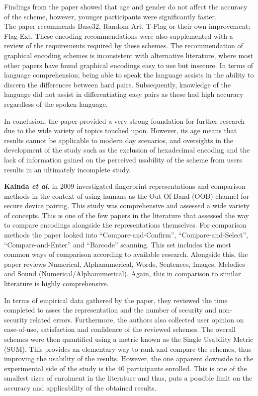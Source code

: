 Findings from the paper showed that age and gender do not affect the accuracy of the scheme, however, younger participants were significantly faster. \\
The paper recommends Base32, Random Art, T-Flag or their own improvement; Flag Ext. These encoding recommendations were also supplemented with a review of the requirements required by these schemes. The recommendation of graphical encoding schemes is inconsistent with alternative literature, where most other papers have found graphical encodings easy to use but insecure.
In terms of language comprehension; being able to speak the language assists in the ability to discern the differences between hard pairs. Subsequently, knowledge of the language did not assist in differentiating easy pairs as these had high accuracy regardless of the spoken language.

In conclusion, the paper provided a very strong foundation for further research due to the wide variety of topics touched upon. However, its age means that results cannot be applicable to modern day scenarios, and oversights in the development of the study such as the exclusion of hexadecimal encoding and the lack of information gained on the perceived usability of the scheme from users results in an ultimately incomplete study.

\textbf{Kainda \textit{et al.}}\cite{kainda2009usability} in 2009 investigated fingerprint representations and comparison methods in the context of using humans as the Out-Of-Band (OOB) channel for secure device pairing. This study was comprehensive and assessed a wide variety of concepts. This is one of the few papers in the literature that assessed the way to compare encodings alongside the representations themselves. For comparison methods the paper looked into ``Compare-and-Confirm'', ``Compare-and-Select'', ``Compare-and-Enter'' and ``Barcode'' scanning. This set includes the most common ways of comparison according to available research. Alongside this, the paper reviews Numerical, Alphanumerical, Words, Sentences, Images, Melodies and Sound (Numerical/Alphanumerical). Again, this in comparison to similar literature is highly comprehensive.

In terms of empirical data gathered by the paper, they reviewed the time completed to asses the representation and the number of security and non-security related errors. Furthermore, the authors also collected user opinion on ease-of-use, satisfaction and confidence of the reviewed schemes. The overall schemes were then quantified using a metric known as the Single Usability Metric (SUM)\cite{sauro2005method}. This provides an elementary way to rank and compare the schemes, thus improving the usability of the results. 
However, the one apparent downside to the experimental side of the study is the 40 participants enrolled. This is one of the smallest sizes of enrolment in the literature and thus, puts a possible limit on the accuracy and applicability of the obtained results. 

